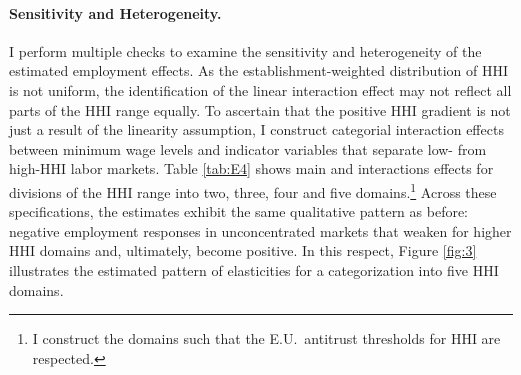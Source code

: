 \documentclass[11pt,oneside,reqno,xcolor=dvipsnames]{article} %
\begin{document}
\paragraph{Sensitivity and Heterogeneity.} I perform multiple checks to examine the sensitivity and heterogeneity of the estimated employment effects. As the establishment-weighted distribution of HHI is not uniform, the identification of the linear interaction effect may not reflect all parts of the HHI range equally. To ascertain that the positive HHI gradient is not just a result of the linearity assumption, I construct categorial interaction effects between minimum wage levels and indicator variables that separate low- from high-HHI labor markets. Table \ref{tab:E4} shows main and interactions effects for divisions of the HHI range into two, three, four and five domains.\footnote{I construct the domains such that the E.U.\ antitrust thresholds for HHI are respected.} Across these specifications, the estimates exhibit the same qualitative pattern as before: negative employment responses in unconcentrated markets that weaken for higher HHI domains and, ultimately, become positive. In this respect, Figure \ref{fig:3} illustrates the estimated pattern of elasticities for a categorization into five HHI domains.
\end{document}
